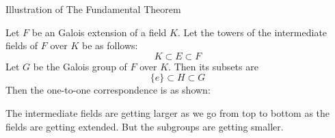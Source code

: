 \documentclass{beamer}
\begin{document}
\begin{frame}{Illustration of The Fundamental Theorem}
  \begin{minipage}{0.65\textwidth}
  Let \(F\) be an Galois extension of a field \(K\). Let the towers of the intermediate fields of \(F\) over \(K\) be as follows:
  \[
    K \subset E \subset F
  \]
\noindent
  Let \(G\) be the Galois group of \(F\) over \(K\). Then its subsets are
  \[
    \{e\} \subset H \subset G
  \]
  Then the one-to-one correspondence is as shown:
\end{minipage}
\begin{minipage}{0.3\textwidth}

  \begin{tcolorbox}[colback=orange!20, colframe=orange!80!black, title={\footnotesize \textcolor{white}{Galois-correspondence}}, width=4cm]
  \end{tcolorbox}
\end{minipage}

\vspace{5mm}

 \begin{tcolorbox}[colframe=blue!40]
\begin{definition}[Remark]
  The intermediate fields are getting larger as we go from top to bottom  as the fields are getting extended. But the subgroups are getting smaller.
\end{definition}
\end{tcolorbox}
\end{frame}
\end{document}
